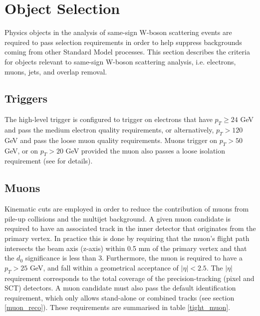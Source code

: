 \section{Object Selection}
\label{object_selection}
Physics objects in the analysis of same-sign W-boson scattering events are required to pass selection requirements in order to help suppress backgrounds coming from other Standard Model processes. This section describes the criteria for objects relevant to same-sign W-boson scattering analysis, i.e. electrons, muons, jets, and overlap removal.
\subsection{Triggers}
The high-level trigger is configured to trigger on electrons that have $p_{T} \geq 24$ GeV and pass the medium electron quality requirements, or alternatively, $p_{T} > 120$ GeV and pass the loose muon quality requirements. Muons trigger on $p_{T} > 50$ GeV, or on $p_{T} > 20$ GeV provided the muon also passes a loose isolation requirement (see \cite{trigger} for details).
\subsection{Muons}
Kinematic cuts are employed in order to reduce the contribution of muons from pile-up collisions and the multijet background. A given muon candidate is required to have an associated track in the inner detector that originates from the primary vertex. In practice this is done by requiring that the muon's flight path intersects the beam axis (z-axis) within 0.5 mm of the primary vertex and that the $d_{0}$ significance is less than 3. Furthermore, the muon is required to have a $p_{T} > 25$ GeV, and fall within a geometrical acceptance of $| \eta | < 2.5$. The $ | \eta | $ requirement corresponds to the total coverage of the precision-tracking (pixel and SCT) detectors. A muon candidate must also pass the default identification requirement, which only allows stand-alone or combined tracks (see section \ref{muon_reco}). These requirements are summarised in table \ref{tight_muon}.

\begin{table}[h]
	\caption{Signal muon definition}
	\label{tight_muon}
\end{table}

